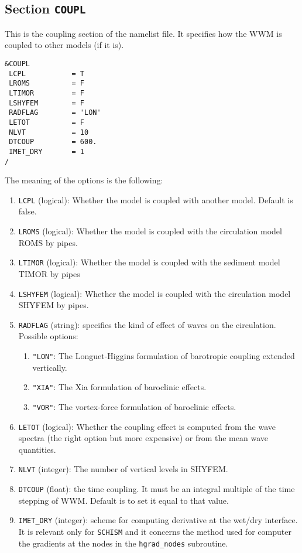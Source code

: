 \documentclass[12pt]{amsart}
\begin{document}
\subsection{Section {\tt COUPL}}
This is the coupling section of the namelist file. It specifies how the WWM is coupled to other models (if it is).
\begin{verbatim}
&COUPL
 LCPL           = T                
 LROMS          = F                
 LTIMOR         = F                
 LSHYFEM        = F                
 RADFLAG        = 'LON'
 LETOT          = F                
 NLVT           = 10     
 DTCOUP         = 600.   
 IMET_DRY       = 1
/
\end{verbatim}
The meaning of the options is the following:
\begin{enumerate}
\item {\tt LCPL} (logical): Whether the model is coupled with another model. Default is false.
\item {\tt LROMS} (logical): Whether the model is coupled with the circulation model ROMS by pipes.
\item {\tt LTIMOR} (logical): Whether the model is coupled with the sediment model TIMOR by pipes
\item {\tt LSHYFEM} (logical): Whether the model is coupled with the circulation model SHYFEM by pipes.
\item {\tt RADFLAG} (string): specifies the kind of effect of waves on the circulation. Possible options:
  \begin{enumerate}
  \item {\tt "LON"}: The Longuet-Higgins formulation of barotropic coupling extended vertically.
  \item {\tt "XIA"}: The Xia formulation of baroclinic effects.
  \item {\tt "VOR"}: The vortex-force formulation of baroclinic effects.
  \end{enumerate}
\item {\tt LETOT} (logical): Whether the coupling effect is computed from the wave spectra (the right option but more expensive) or from the mean wave quantities.
\item {\tt NLVT} (integer): The number of vertical levels in SHYFEM.
\item {\tt DTCOUP} (float): the time coupling. It must be an integral multiple of the time stepping of WWM. Default is to set it equal to that value.
\item {\tt IMET\_DRY} (integer): scheme for computing derivative at the wet/dry interface. It is relevant only for {\tt SCHISM} and it concerns the method used for computer the gradients at the nodes in the {\tt hgrad\_nodes} subroutine.
\end{enumerate}
\end{document}
